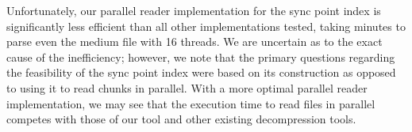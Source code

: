 Unfortunately, our parallel reader implementation for the sync point index is significantly less 
efficient than all other implementations tested, taking minutes to parse even the medium file with 
16 threads. We are uncertain as to the exact cause of the inefficiency; however, we note that the primary 
questions regarding the feasibility of the sync point index were based on its construction as opposed 
to using it to read chunks in parallel. With a more optimal parallel reader implementation, we may 
see that the execution time to read \gzip files in parallel competes with those of our \ibuilder tool
and other existing decompression tools.

